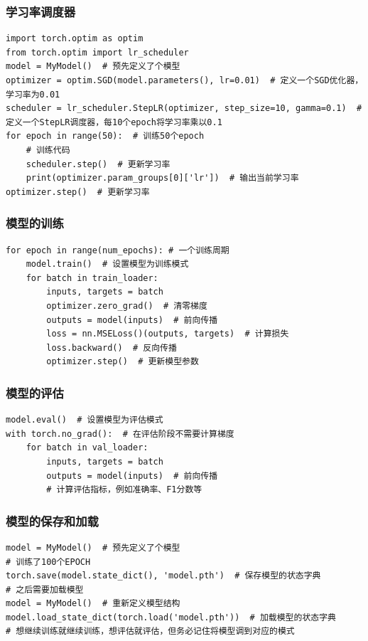 \begin{frame}[fragile]
    \frametitle{学习率调度器}

    \begin{verbatim}
import torch.optim as optim
from torch.optim import lr_scheduler
model = MyModel()  # 预先定义了个模型
optimizer = optim.SGD(model.parameters(), lr=0.01)  # 定义一个SGD优化器，学习率为0.01
scheduler = lr_scheduler.StepLR(optimizer, step_size=10, gamma=0.1)  # 定义一个StepLR调度器，每10个epoch将学习率乘以0.1
for epoch in range(50):  # 训练50个epoch
    # 训练代码
    scheduler.step()  # 更新学习率
    print(optimizer.param_groups[0]['lr'])  # 输出当前学习率
optimizer.step()  # 更新学习率
    \end{verbatim}
    

\end{frame}

\begin{frame}[fragile]
    \frametitle{模型的训练}

    \begin{verbatim}
for epoch in range(num_epochs): # 一个训练周期
    model.train()  # 设置模型为训练模式
    for batch in train_loader:
        inputs, targets = batch
        optimizer.zero_grad()  # 清零梯度
        outputs = model(inputs)  # 前向传播
        loss = nn.MSELoss()(outputs, targets)  # 计算损失
        loss.backward()  # 反向传播
        optimizer.step()  # 更新模型参数
    \end{verbatim}

\end{frame}

\begin{frame}[fragile]
    \frametitle{模型的评估}

    \begin{verbatim}
model.eval()  # 设置模型为评估模式
with torch.no_grad():  # 在评估阶段不需要计算梯度
    for batch in val_loader:
        inputs, targets = batch
        outputs = model(inputs)  # 前向传播
        # 计算评估指标，例如准确率、F1分数等
    \end{verbatim}

\end{frame}

\begin{frame}[fragile]
    \frametitle{模型的保存和加载}

    \begin{verbatim}
model = MyModel()  # 预先定义了个模型
# 训练了100个EPOCH
torch.save(model.state_dict(), 'model.pth')  # 保存模型的状态字典
# 之后需要加载模型
model = MyModel()  # 重新定义模型结构
model.load_state_dict(torch.load('model.pth'))  # 加载模型的状态字典
# 想继续训练就继续训练，想评估就评估，但务必记住将模型调到对应的模式
    \end{verbatim}

\end{frame}

